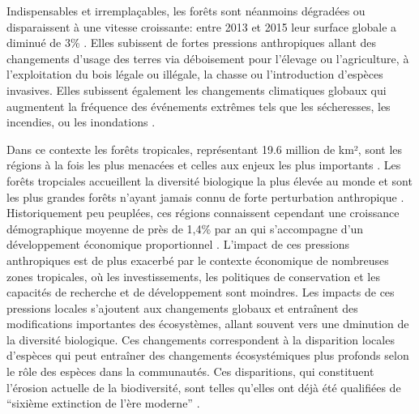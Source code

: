 \documentclass[
  11pt,
  french,
  A4paper,
  extrafontsizes,onecolumn,openright
  ]{memoir}
\begin{document}
Indispensables et irremplaçables, les forêts sont néanmoins dégradées ou
disparaissent à une vitesse croissante: entre 2013 et 2015 leur surface
globale a diminué de 3\% \autocite{FAO2009}. Elles subissent de fortes
pressions anthropiques allant des changements d'usage des terres via
déboisement pour l'élevage ou l'agriculture, à l'exploitation du bois
légale ou illégale, la chasse ou l'introduction d'espèces invasives.
Elles subissent également les changements climatiques globaux qui
augmentent la fréquence des événements extrêmes tels que les
sécheresses, les incendies, ou les inondations
\autocite{Pachauri2014}.\newline

Dans ce contexte les forêts tropicales, représentant 19.6 million de
km², sont les régions à la fois les plus menacées et celles aux enjeux
les plus importants \autocite{Barlow2018}. Les forêts tropciales
accueillent la diversité biologique la plus élevée au monde et sont les
plus grandes forêts n'ayant jamais connu de forte perturbation
anthropique \autocites{Gentry1988}{FAO2011}. Historiquement peu
peuplées, ces régions connaissent cependant une croissance démographique
moyenne de près de 1,4\% par an qui s'accompagne d'un développement
économique proportionnel \autocite{Asner2009}. L'impact de ces pressions
anthropiques est de plus exacerbé par le contexte économique de
nombreuses zones tropicales, où les investissements, les politiques de
conservation et les capacités de recherche et de développement sont
moindres. Les impacts de ces pressions locales s'ajoutent aux
changements globaux et entraînent des modifications importantes des
écosystèmes, allant souvent vers une dminution de la diversité
biologique. Ces changements correspondent à la disparition locales
d'espèces qui peut entraîner des changements écosystémiques plus
profonds selon le rôle des espèces dans la communautés. Ces
disparitions, qui constituent l'érosion actuelle de la biodiversité,
sont telles qu'elles ont déjà été qualifiées de ``sixième extinction de
l'ère moderne'' \autocites{Vitousek1997}{Cardinale2012}.
\end{document}
